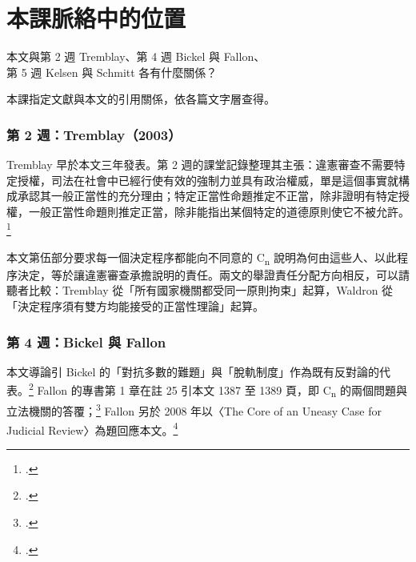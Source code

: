 \chapter{本課脈絡中的位置}


\begin{qaquestion}
本文與第 2 週 Tremblay、第 4 週 Bickel 與 Fallon、\\
第 5 週 Kelsen 與 Schmitt 各有什麼關係？
\end{qaquestion}

\begin{qafigure}{本課指定文獻與本文的引用關係，依各篇文字層查得。\label{fig:course}}

\end{qafigure}

\subsection{第 2 週：Tremblay（2003）}

Tremblay 早於本文三年發表。第 2 週的課堂記錄整理其主張：違憲審查不需要特定授權，司法在社會中已經行使有效的強制力並具有政治權威，單是這個事實就構成承認其一般正當性的充分理由；特定正當性命題推定不正當，除非證明有特定授權，一般正當性命題則推定正當，除非能指出某個特定的道德原則使它不被允許。\footcite[525--562]{tremblay2003}

\begin{readernote}
本文第伍部分要求每一個決定程序都能向不同意的 C\textsubscript{n} 說明為何由這些人、以此程序決定，等於讓違憲審查承擔說明的責任。兩文的舉證責任分配方向相反，可以請聽者比較：Tremblay 從「所有國家機關都受同一原則拘束」起算，Waldron 從「決定程序須有雙方均能接受的正當性理論」起算。
\end{readernote}

\subsection{第 4 週：Bickel 與 Fallon}

本文導論引 Bickel 的「對抗多數的難題」與「脫軌制度」作為既有反對論的代表。\footcite{bickel1962} Fallon 的專書第 1 章在註 25 引本文 1387 至 1389 頁，即 C\textsubscript{n} 的兩個問題與立法機關的答覆；\footcite[181 註 25]{fallon2018} Fallon 另於 2008 年以〈The Core of an Uneasy Case for Judicial Review〉為題回應本文。\footcite{fallon2008}

